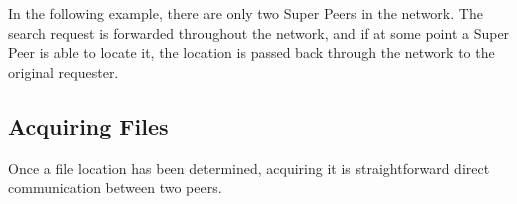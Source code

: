 In the following example, there are only two Super Peers in the network.  The
search request is forwarded throughout the network, and if at some point a Super
Peer is able to locate it, the location is passed back through the network to
the original requester.

\noindent{}

\subsection{Acquiring Files}

Once a file location has been determined, acquiring it is straightforward direct
communication between two peers.

\noindent{}
